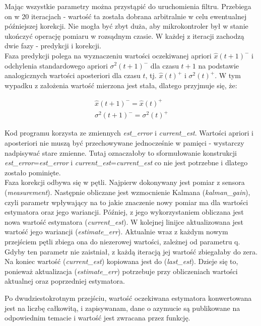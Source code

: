 Mając wszystkie parametry można przystąpić do uruchomienia filtru. Przebiega on w 20 iteracjach - wartość ta została dobrana arbitralnie w celu ewentualnej późniejszej korekcji. Nie mogła być zbyt duża, aby mikrokontroler był w stanie ukończyć operację pomiaru w rozsądnym czasie. W każdej z iteracji zachodzą dwie fazy - predykcji i korekcji.
\\

Faza predykcji polega na wyznaczeniu wartości oczekiwanej apriori $\hat{x}(t+1)^-$ i odchylenia standardowego apriori $\sigma^2(t+1)^-$ dla czasu $t+1$ na podstawie analogicznych wartości aposteriori dla czasu $t$, tj.  $\hat{x}(t)^+$ i $\sigma^2(t)^+$. W tym wypadku z założenia wartość mierzona jest stała, dlatego przyjmuje się, że:

\begin{equation}
\begin{aligned}
    \hat{x}(t+1)^- = \hat{x}(t)^+ \\
    \sigma^2(t+1)^- = \sigma^2(t)^+    
\end{aligned}
\label{eq:x-apriori-aposteriori}
\end{equation}

Kod programu korzysta ze zmiennych \emph{est\_error} i \emph{current\_est}. Wartości apriori i aposteriori nie muszą być przechowywane jednocześnie w pamięci - wystarczy nadpisywać stare zmienne. Tutaj oznaczałoby to sformułowanie konstrukcji \emph{est\_error}=\emph{est\_error} i \emph{current\_est}=\emph{current\_est} co nie jest potrzebne i dlatego zostało pominięte.
\\

Faza korekcji odbywa się w pętli. Najpierw dokonywany jest pomiar z sensora (\emph{measurement}). Następnie obliczane jest wzmocnienie Kalmana (\emph{kalman\_gain}), czyli parametr wpływający na to jakie znaczenie nowy pomiar ma dla wartości estymatora oraz jego wariancji. Później, z jego wykorzystaniem obliczana jest nowa wartość estymatora (\emph{current\_est}). W kolejnej linijce aktualizowana jest wartość jego wariancji (\emph{estimate\_err}). Aktualnie wraz z każdym nowym przejściem pętli zbiega ona do niezerowej wartości, zależnej od parametru q. Gdyby ten parametr nie zaistniał, z każdą iteracją jej wartość zbiegałaby do zera. Na koniec wartość (\emph{current\_est}) kopiowana jest do (\emph{last\_est}). Dzieje się to, ponieważ aktualizacja (\emph{estimate\_err}) potrzebuje przy obliczeniach wartości aktualnej oraz poprzedniej estymatora.

Po dwudziestokrotnym przejściu, wartość oczekiwana estymatora konwertowana jest na liczbę całkowitą, i zapisywanam, dane o azymucie są publikowane na odpowiednim temacie i wartość jest zwracana przez funkcję.

